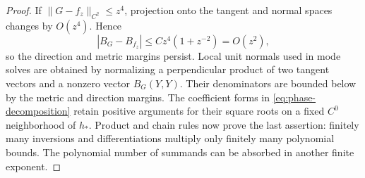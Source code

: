 \begin{proof}
If $\|G-f_z\|_{C^2}\le z^4$, projection onto the tangent and normal spaces changes
by $O(z^4)$. Hence
\[
 |B_G-B_{f_z}|\le C z^4(1+z^{-2})=O(z^2),
\]
so the direction and metric margins persist. Local unit normals used in mode
solves are obtained by normalizing a perpendicular product of two tangent
vectors and a nonzero vector $B_G(Y,Y)$. Their denominators are bounded below
by the metric and direction margins. The coefficient forms in
\eqref{eq:phase-decomposition} retain positive arguments for their square roots
on a fixed $C^0$ neighborhood of $h_*$. Product and chain rules now prove the
last assertion: finitely many inversions and differentiations multiply only
finitely many polynomial bounds. The polynomial number of summands can be
absorbed in another finite exponent.
\end{proof}
